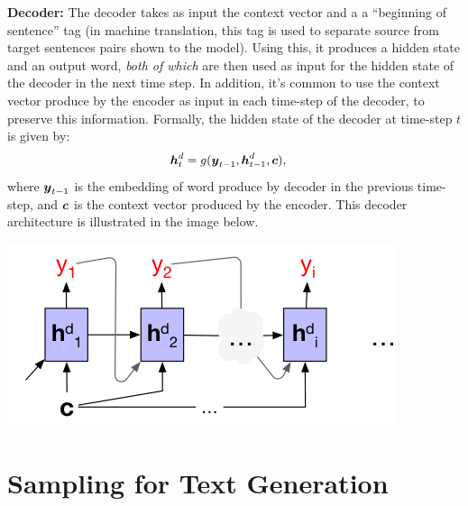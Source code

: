 \documentclass[11pt,a4paper]{article}
\begin{document}
\begin{enumerate}[label=(\alph*)]
          \textbf{Decoder:} The decoder takes as input the context vector and a
          a ``beginning of sentence'' tag (in machine translation, this tag is
          used to separate source from target sentences pairs shown to the
          model).
          Using this, it produces a hidden state and an output word,
          \emph{both of which} are then used as input for the hidden state of
          the decoder in the next time step.
          In addition, it's common to use the context vector produce by the
          encoder as input in each time-step of the decoder, to preserve this
          information.
          Formally, the hidden state of the decoder at time-step $t$ is given
          by:
          \begin{align*}
              {\boldsymbol{h}}_t^d & = g({\boldsymbol{y}}_{t-1},{\boldsymbol{h}}_{t-1}^d,{\boldsymbol{c}}),
          \end{align*}
          where ${\boldsymbol{y}}_{t-1}$ is the embedding of word produce by decoder in the
          previous time-step, and ${\boldsymbol{c}}$ is the context vector produced by the
          encoder.
          This decoder architecture is illustrated in the image below.
          \begin{center}
              \includegraphics[scale=0.5]{img/encoder_decoder_for_mt_1.png}
          \end{center}
\end{enumerate}

\section{Sampling for Text Generation}
\end{document}
